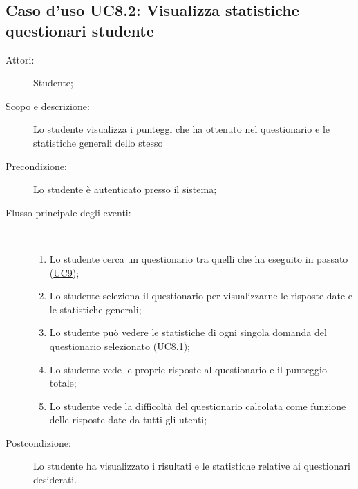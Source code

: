 \subsection{Caso d'uso UC8.2: Visualizza statistiche questionari studente}\begin{description}
\item[Attori:] Studente;
\item[Scopo e descrizione:] Lo studente visualizza i punteggi che ha ottenuto nel questionario e le statistiche generali dello stesso
      \item[Precondizione:] Lo studente è autenticato presso il sistema;

        \item[Flusso principale degli eventi:] \ 
 \begin{enumerate}
          \item Lo studente cerca un questionario tra quelli che ha eseguito in passato (\hyperlink{UC9}{UC9});
          \item Lo studente seleziona il questionario per visualizzarne le risposte date e le statistiche generali;
          \item Lo studente può vedere le statistiche di ogni singola domanda del questionario selezionato (\hyperlink{UC8.1}{UC8.1});
          \item Lo studente vede le proprie risposte al questionario e il punteggio totale;
          \item Lo studente vede la difficoltà del questionario calcolata come funzione delle risposte date da tutti gli utenti;

      \end{enumerate}
    \item[Postcondizione:] Lo studente ha visualizzato i risultati e le statistiche relative ai questionari desiderati.
  \end{description}
\hypertarget{UC8.3}{}
